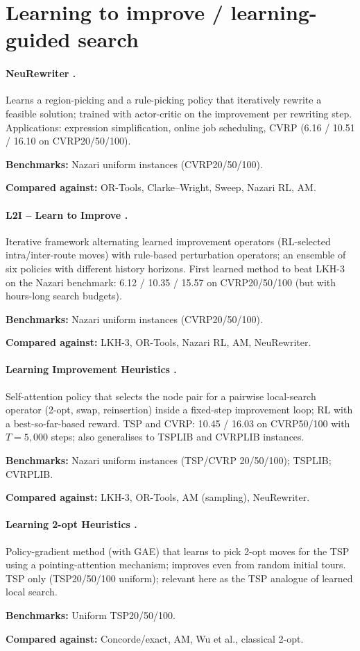 \documentclass[11pt]{article}
\newcommand{\benchline}[1]{\par\smallskip\noindent\textbf{Benchmarks:} #1}
\newcommand{\baseline}[1]{\par\noindent\textbf{Compared against:} #1}
\begin{document}
\section{Learning to improve / learning-guided search}

\paragraph{NeuRewriter \citep{chen_learning_2019}.}
Learns a region-picking and a rule-picking policy that iteratively rewrite a feasible
solution; trained with actor-critic on the improvement per rewriting step. Applications:
expression simplification, online job scheduling, CVRP (6.16 / 10.51 / 16.10 on
CVRP20/50/100).
\benchline{Nazari uniform instances (CVRP20/50/100).}
\baseline{OR-Tools, Clarke--Wright, Sweep, Nazari RL, AM.}

\paragraph{L2I -- Learn to Improve \citep{Lu2020A}.}
Iterative framework alternating learned improvement operators (RL-selected intra/inter-route
moves) with rule-based perturbation operators; an ensemble of six policies with different
history horizons. First learned method to beat LKH-3 on the Nazari benchmark: 6.12 /
10.35 / 15.57 on CVRP20/50/100 (but with hours-long search budgets).
\benchline{Nazari uniform instances (CVRP20/50/100).}
\baseline{LKH-3, OR-Tools, Nazari RL, AM, NeuRewriter.}

\paragraph{Learning Improvement Heuristics \citep{wu_learning_2022}.}
Self-attention policy that selects the node pair for a pairwise local-search operator
(2-opt, swap, reinsertion) inside a fixed-step improvement loop; RL with a
best-so-far-based reward. TSP and CVRP: 10.45 / 16.03 on CVRP50/100 with $T{=}5{,}000$
steps; also generalises to TSPLIB and CVRPLIB instances.
\benchline{Nazari uniform instances (TSP/CVRP 20/50/100); TSPLIB; CVRPLIB.}
\baseline{LKH-3, OR-Tools, AM (sampling), NeuRewriter.}

\paragraph{Learning 2-opt Heuristics \citep{dacosta_learning_2020}.}
Policy-gradient method (with GAE) that learns to pick 2-opt moves for the TSP using a
pointing-attention mechanism; improves even from random initial tours. TSP only
(TSP20/50/100 uniform); relevant here as the TSP analogue of learned local search.
\benchline{Uniform TSP20/50/100.}
\baseline{Concorde/exact, AM, Wu et al., classical 2-opt.}
\end{document}
